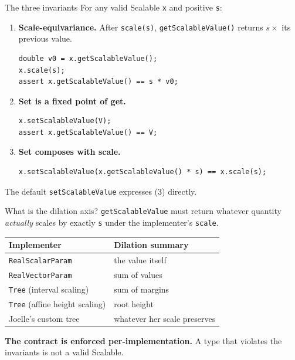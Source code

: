 \documentclass[aspectratio=169,11pt]{beamer}
\newcommand{\code}[1]{\texttt{#1}}
\begin{document}
\begin{frame}[fragile]{The three invariants}
For any valid Scalable \code{x} and positive \code{s}:

\begin{enumerate}
\item \textbf{Scale-equivariance.} After \code{scale(s)}, \code{getScalableValue()} returns $s \times$ its previous value.
\begin{lstlisting}
double v0 = x.getScalableValue();
x.scale(s);
assert x.getScalableValue() == s * v0;
\end{lstlisting}

\item \textbf{Set is a fixed point of get.}
\begin{lstlisting}
x.setScalableValue(V);
assert x.getScalableValue() == V;
\end{lstlisting}

\item \textbf{Set composes with scale.}
\begin{lstlisting}
x.setScalableValue(x.getScalableValue() * s) == x.scale(s);
\end{lstlisting}
\end{enumerate}

\vspace{0.5em}

The default \code{setScalableValue} expresses (3) directly.
\end{frame}

\begin{frame}{What is the dilation axis?}
\code{getScalableValue} must return whatever quantity \emph{actually} scales by exactly \code{s} under the implementer's \code{scale}.

\vspace{1em}

\begin{tabular}{ll}
\toprule
\textbf{Implementer} & \textbf{Dilation summary} \\
\midrule
\code{RealScalarParam} & the value itself \\
\code{RealVectorParam} & sum of values \\
\code{Tree} (interval scaling) & sum of margins \\
\code{Tree} (affine height scaling) & root height \\
Joelle's custom tree & whatever her scale preserves \\
\bottomrule
\end{tabular}

\vspace{1em}

\textbf{The contract is enforced per-implementation.}
A type that violates the invariants is not a valid Scalable.
\end{frame}
\end{document}
